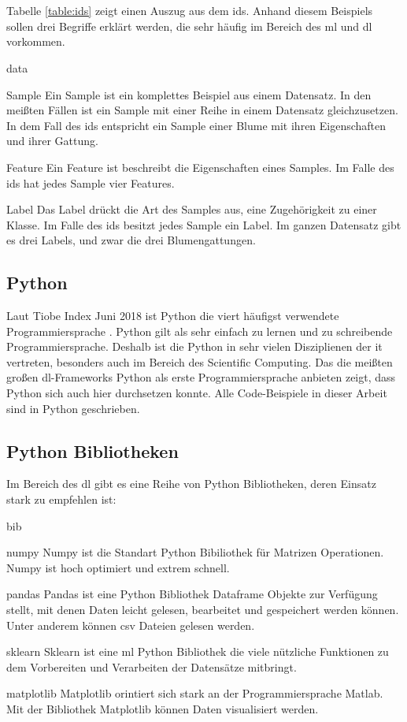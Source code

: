 \documentclass[conference, german]{IEEEtran}
\begin{document}
\\\\
Tabelle \ref{table:ids} zeigt einen Auszug aus dem \ac{ids}.
Anhand diesem Beispiels sollen drei Begriffe erklärt werden, die sehr häufig 
im Bereich des \ac{ml} und \ac{dl} vorkommen.
\begin{mdframed}[backgroundcolor=lightgray]
\begin{labeling}{data}
	\item [Sample] Ein Sample ist ein komplettes Beispiel aus einem Datensatz. 
	In den meißten Fällen ist ein Sample mit einer Reihe in einem Datensatz gleichzusetzen.
	In dem Fall des \ac{ids} entspricht ein Sample einer Blume mit ihren Eigenschaften und ihrer Gattung.
	\item [Feature] Ein Feature ist beschreibt die Eigenschaften eines Samples.
	Im Falle des \ac{ids} hat jedes Sample vier Features.
	\item [Label] Das Label drückt die Art des Samples aus, eine Zugehörigkeit zu einer Klasse.
	Im Falle des \ac{ids} besitzt jedes Sample ein Label. 
	Im ganzen Datensatz gibt es drei Labels, und zwar die drei Blumengattungen.
\end{labeling}
\end{mdframed}

\subsection{Python}
Laut Tiobe Index Juni 2018 ist Python die viert häufigst verwendete Programmiersprache \citep[vgl.][]{TIOBE}. Python gilt als sehr einfach zu lernen und zu schreibende Programmiersprache. Deshalb ist die Python in sehr vielen Disziplienen der \ac{it} vertreten,
besonders auch im Bereich des Scientific Computing. Das die meißten großen \ac{dl}-Frameworks Python als erste Programmiersprache anbieten zeigt, dass Python sich auch hier durchsetzen konnte.
Alle Code-Beispiele in dieser Arbeit sind in Python geschrieben.
\subsection{Python Bibliotheken}
Im Bereich des \ac{dl} gibt es eine Reihe von Python Bibliotheken, deren Einsatz stark zu empfehlen ist:
\begin{mdframed}[backgroundcolor=lightgray]
\begin{labeling}{bib}
	\item [numpy] Numpy ist die Standart Python Bibiliothek für Matrizen Operationen.
	Numpy ist hoch optimiert und extrem schnell. 
	\item [pandas] Pandas ist eine Python Bibliothek Dataframe Objekte zur Verfügung stellt,
	mit denen Daten leicht gelesen, bearbeitet und gespeichert werden können. Unter anderem können \ac{csv} Dateien gelesen werden.
	\item [sklearn] Sklearn ist eine \ac{ml} Python Bibliothek die viele nützliche Funktionen zu dem Vorbereiten und Verarbeiten der Datensätze mitbringt.
	\item [matplotlib] Matplotlib orintiert sich stark an der Programmiersprache Matlab. 
	Mit der Bibliothek Matplotlib können Daten visualisiert werden.
\end{labeling}
\end{mdframed}
\end{document}
